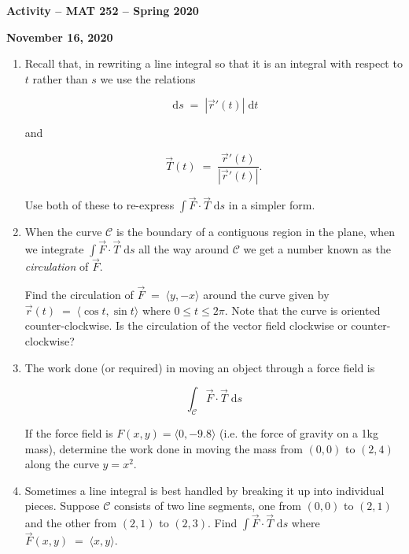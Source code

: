 \documentclass{amsart}
\newcommand{\ds}{\;\mbox{d}s}
\newcommand{\dt}{\;\mbox{d}t}
\begin{document}
\thispagestyle{empty}

\centerline{\Large \bf Activity -- MAT 252 -- Spring 2020}
\bigskip
\centerline{\large \bf November 16, 2020}

\Large

\begin{enumerate}

\item Recall that, in rewriting a line integral so that it is an integral with respect to $t$ rather than $s$ we use the relations

\[ \ds \; = \; | \vec{r}'(t) | \dt \]

and

\[ \vec{T}(t) \; = \; \frac{\vec{r}'(t) }{ |\vec{r}'(t) | }. \] 

Use both of these to re-express $\int \vec{F} \cdot \vec{T} \ds$ in a simpler form.

\vfill

\item When the curve $\mathcal C$ is the boundary of a contiguous region in the plane, when we integrate $\int \vec{F} \cdot \vec{T} \ds$ all the way around $\mathcal C$ we get a number known as the {\em circulation} of $\vec{F}$.  

Find the circulation of $\vec{F} \; = \; \langle y, -x \rangle$ around the curve given by $\vec{r}(t) \; = \; \langle \cos t, \sin t \rangle$ where $0 \leq t \leq 2\pi$.  Note that the curve is oriented counter-clockwise.  Is the circulation of the vector field clockwise or counter-clockwise?

\vfill

\newpage

\item The work done (or required) in moving an object through a force field is

\[ \int_{\mathcal C} \vec{F} \cdot \vec{T} \ds \] 

If the force field is $F(x,y) = \langle 0, -9.8 \rangle$ (i.e. the force of gravity on a 1kg mass), determine the work done in moving the mass from $(0,0)$ to $(2,4)$ along the curve $y=x^2$. 

\vfill


\item Sometimes a line integral is best handled by breaking it up into individual pieces.  Suppose $\mathcal C$ consists of two line segments, one from $(0,0)$ to $(2,1)$ and the other from $(2,1)$ to $(2, 3)$.   Find 
$\int \vec{F} \cdot \vec{T} \ds$ where $\vec{F}(x,y) \; = \; \langle x, y \rangle$.


\end{enumerate}
\end{document}
